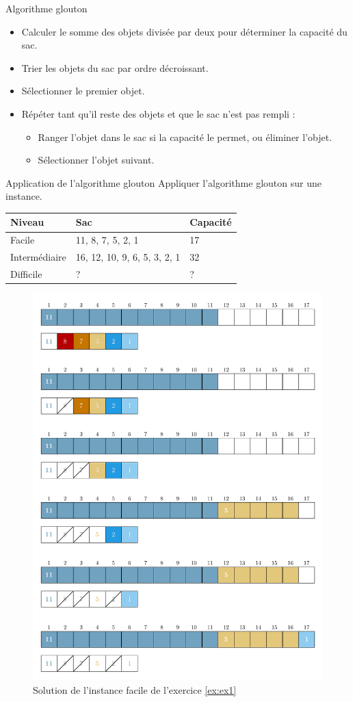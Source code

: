 \documentclass[11pt]{article}
\begin{document}
  \begin{algorithme}{Algorithme glouton}
    \begin{itemize}
    \item Calculer le somme des objets divisée par deux pour déterminer la capacité du sac.
    \item Trier les objets du sac par ordre décroissant.
    \item Sélectionner le premier objet.
    \item  Répéter tant qu'il reste des objets et que le sac n'est pas rempli :
      \begin{itemize}
      \item Ranger l'objet dans le sac si la capacité le permet, ou éliminer l'objet.
      \item Sélectionner l'objet suivant.
      \end{itemize}
  \end{itemize}
  \end{algorithme}

  \begin{exercice}{Application de l'algorithme glouton}
    \label{ex:ex1}
    Appliquer l'algorithme glouton sur une instance.\\
    \begin{tabular}{lll}
      \toprule
      Niveau & Sac & Capacité \\
      \midrule
      Facile & 11, 8, 7, 5, 2, 1 & 17 \\
      Intermédiaire & 16, 12, 10, 9, 6, 5, 3, 2, 1 & 32 \\
      Difficile & ? & ? \\
      \bottomrule
      \end{tabular}
  \end{exercice}

  \begin{figure}[htbp]
    \centering
    \includegraphics[width=0.6\linewidth]{ex1-6-GS.pdf}
    \caption{Solution de l'instance facile de l'exercice \ref{ex:ex1}}
  \end{figure}
\end{document}
